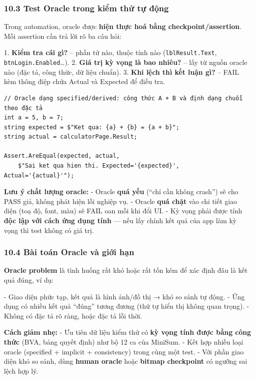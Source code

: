 \subsubsection{10.3 Test Oracle trong kiểm thử tự động}

Trong automation, oracle được \textbf{hiện thực hoá bằng checkpoint/assertion}. Mỗi assertion cần trả lời rõ ba câu hỏi:

1. \textbf{Kiểm tra cái gì?} – phần tử nào, thuộc tính nào (\texttt{lblResult.Text}, \texttt{btnLogin.Enabled}…).
2. \textbf{Giá trị kỳ vọng là bao nhiêu?} – lấy từ nguồn oracle nào (đặc tả, công thức, dữ liệu chuẩn).
3. \textbf{Khi lệch thì kết luận gì?} – FAIL kèm thông điệp chứa Actual và Expected để điều tra.

\begin{lstlisting}
// Oracle dạng specified/derived: công thức A + B và định dạng chuỗi theo đặc tả
int a = 5, b = 7;
string expected = $"Ket qua: {a} + {b} = {a + b}";
string actual = calculatorPage.Result;

Assert.AreEqual(expected, actual,
    $"Sai ket qua hien thi. Expected='{expected}', Actual='{actual}'");
\end{lstlisting}


\textbf{Lưu ý chất lượng oracle:}
- Oracle \textbf{quá yếu} (“chỉ cần không crash”) sẽ cho PASS giả, không phát hiện lỗi nghiệp vụ.
- Oracle \textbf{quá chặt} vào chi tiết giao diện (toạ độ, font, màu) sẽ FAIL oan mỗi khi đổi UI.
- Kỳ vọng phải được tính \textbf{độc lập với cách ứng dụng tính} — nếu lấy chính kết quả của app làm kỳ vọng thì test không có giá trị.

\subsubsection{10.4 Bài toán Oracle và giới hạn}

\textbf{Oracle problem} là tình huống rất khó hoặc rất tốn kém để xác định đâu là kết quả đúng, ví dụ:

- Giao diện phức tạp, kết quả là hình ảnh/đồ thị → khó so sánh tự động.
- Ứng dụng có nhiều kết quả “đúng” tương đương (thứ tự hiển thị không quan trọng).
- Không có đặc tả rõ ràng, hoặc đặc tả lỗi thời.

\textbf{Cách giảm nhẹ:}
- Ưu tiên dữ liệu kiểm thử có \textbf{kỳ vọng tính được bằng công thức} (BVA, bảng quyết định) như bộ 12 ca của MiniSum.
- Kết hợp nhiều loại oracle (specified + implicit + consistency) trong cùng một test.
- Với phần giao diện khó so sánh, dùng \textbf{human oracle} hoặc \textbf{bitmap checkpoint} có ngưỡng sai lệch hợp lý.

